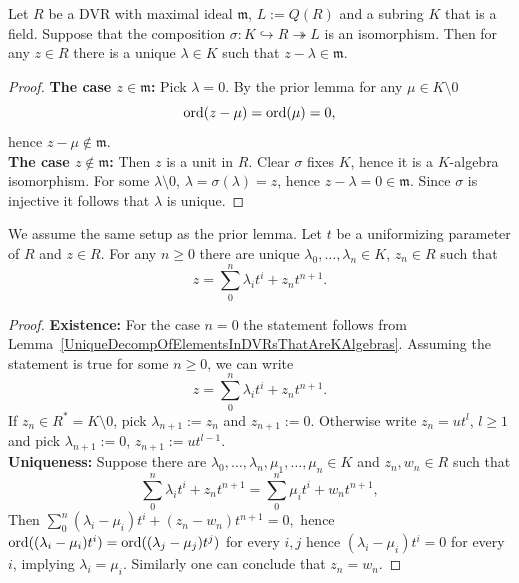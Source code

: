     \begin{lemma}\label{UniqueDecompOfElementsInDVRsThatAreKAlgebras}
        Let $R$ be a DVR with maximal ideal $\mathfrak{m}$, $L:=Q(R)$ and a subring $K$ that is a field. Suppose that the composition $\sigma: K \hookrightarrow R \twoheadrightarrow L$ is an isomorphism. Then for any $z\in R$ there is a unique $\lambda \in K$ such that $z-\lambda\in \mathfrak{m}$. 
    \end{lemma}
    \begin{proof}
        \textbf{The case $z\in \mathfrak{m}$:} Pick $\lambda =0$. By the prior lemma for any $\mu\in K\setminus0$ 
        $$\mathrm{ord}(z-\mu)=\mathrm{ord}(\mu)=0,$$
         hence $z-\mu\notin \mathfrak{m}$.\\
        \textbf{The case $z\notin \mathfrak{m}$:} Then $z$ is a unit in $R$. Clear $\sigma$ fixes $K$, hence it is a $K$-algebra isomorphism. For some $\lambda \setminus 0$, $\lambda =\sigma(\lambda)=z$, hence $z-\lambda =0\in \mathfrak{m}$. Since $\sigma$ is injective it follows that $\lambda$ is unique. 
    \end{proof}
    \begin{proposition}\label{PropositionTowardsPowerSeriesDescriptionOfCerationDVRs}
        We assume the same setup as the prior lemma. Let $t$ be a uniformizing parameter of $R$ and $z\in R$. For any $n\geq 0$ there are unique $\lambda_0,\dots,\lambda_n\in K$, $z_{n}\in R$ such that 
        $$z = \sum_0^n \lambda_it^i + z_nt^{n+1}.$$
    \end{proposition}
    \begin{proof}
        \textbf{Existence:} For the case $n=0$ the statement follows from Lemma~\ref{UniqueDecompOfElementsInDVRsThatAreKAlgebras}. Assuming the statement is true for some $n\geq0$, we can write 
        $$z = \sum_0^n \lambda_it^i+z_nt^{n+1}.$$
        If $z_n \in R^\ast = K\setminus 0$, pick $\lambda_{n+1} := z_n$ and $z_{n+1}:=0$. Otherwise write $z_n = ut^l$, $l\geq 1$ and pick $\lambda_{n+1}:=0$, $z_{n+1} := ut^{l-1}$.\\
        \textbf{Uniqueness:} Suppose there are $\lambda_0,\dots,\lambda_n,\mu_1,\dots,\mu_n\in K$ and $z_n,w_n\in R$ such that 
        $$\sum_0^n \lambda_it^i +z_nt^{n+1} = \sum_0^n \mu_it^i +w_nt^{n+1},$$
        Then $\sum_0^n (\lambda_i-\mu_i)t^i + (z_n-w_n)t^{n+1}=0,$
        hence $\mathrm{ord}((\lambda_i-\mu_i)t^i)=\mathrm{ord}((\lambda_j-\mu_j)t^j)$ for every $i,j$ hence $(\lambda_i-\mu_i)t^i=0$ for every $i$, implying $\lambda_i=\mu_i$. Similarly one can conclude that $z_n=w_n$.  
    \end{proof}
